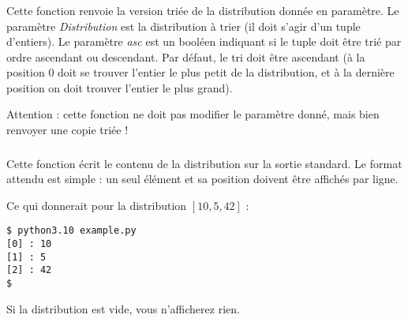 \subsubsection*{}

\noindent Cette fonction renvoie la version triée de la distribution donnée en paramètre.
Le paramètre \textit{Distribution} est la distribution à trier (il doit s'agir d'un tuple d'entiers).
Le paramètre \textit{asc} est un booléen indiquant si le tuple doit être trié par ordre ascendant ou descendant.
Par défaut, le tri doit être ascendant (à la position $ 0 $ doit se trouver l'entier le plus petit de la distribution, et à la dernière position on doit trouver l'entier le plus grand).

\medskip

\noindent Attention : cette fonction ne doit pas modifier le paramètre donné, mais bien renvoyer une copie triée !


\subsubsection*{}

\noindent Cette fonction écrit le contenu de la distribution sur la sortie standard.
Le format attendu est simple : un seul élément et sa position doivent être affichés par ligne.

\bigskip

\noindent {}

\bigskip

\noindent Ce qui donnerait pour la distribution $ [ 10, 5, 42 ] $ :

\lstset{language=sh}
\begin{lstlisting}[frame=single]
$ python3.10 example.py
[0] : 10
[1] : 5
[2] : 42
$
\end{lstlisting}

\bigskip

\noindent Si la distribution est vide, vous n'afficherez rien.



\subsubsection*{}

